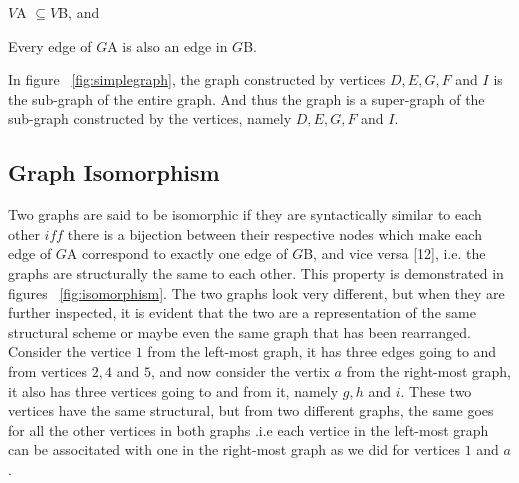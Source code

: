 \begin{myEnumerate}
  \item $V${\tiny A} $ \subseteq V${\tiny B}, and
  \item Every edge of $G${\tiny A} is also an edge in $G${\tiny B}.
\end{myEnumerate}

In figure  ~\ref{fig:simplegraph}, the graph constructed by vertices $D,E,G,F$ and $I$ is the sub-graph of the entire graph. And thus the graph is a super-graph of the sub-graph constructed by the vertices, namely $D,E,G,F$ and $I$.

\subsection{Graph Isomorphism}
Two graphs are said to be isomorphic if they are syntactically similar to each other $iff$ there is a bijection between their respective nodes which make each edge of $G${\tiny A} correspond to exactly one edge of $G${\tiny B}, and vice versa [12], i.e. the graphs are structurally the same to each other. This property is demonstrated in figures ~\ref{fig:isomorphism}. 
\newpage
The two graphs look very different, but when they are further inspected, it is evident that the two are a representation of the same structural scheme or maybe even the same graph that has been rearranged. \newline\newline Consider the vertice $1$ from the left-most graph, it has three edges going to and from vertices $2,4$ and $5$, and now consider the vertix $a$ from the right-most graph, it also has three vertices going to and from it, namely $g,h$ and $i$. These two vertices have the same structural, but from two different graphs, the same goes for all the other vertices in both graphs .i.e each vertice in the left-most graph can be associtated with one in the right-most graph as we did for vertices $1$ and $a$.

